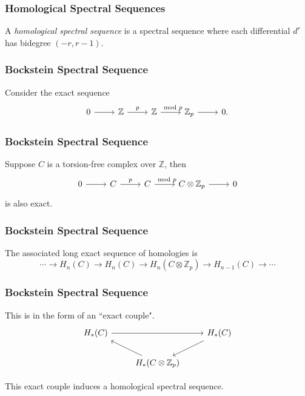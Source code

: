\documentclass{beamer}
\begin{document}

\begin{frame}
	\frametitle{Homological Spectral Sequences}

	\begin{definition}
		A \textit{homological spectral sequence} is a spectral sequence where each differential $d^{r}$ has bidegree $(-r,r-1)$.
	\end{definition}
\end{frame}

\begin{frame}[fragile]
	\frametitle{Bockstein Spectral Sequence}

	Consider the exact sequence
	\[
		\begin{tikzcd}
			0 \arrow[r] & \mathbb{Z} \arrow[r, "p"] & \mathbb{Z} \arrow[r, "\mod p"] & \mathbb{Z}_p \arrow[r] & 0.
		\end{tikzcd}
	\] 
\end{frame}

\begin{frame}[fragile]
	\frametitle{Bockstein Spectral Sequence}

	Suppose $C$ is a torsion-free complex over $\mathbb{Z}$, then
	\[
		\begin{tikzcd}
                        0 \arrow[r] & C \arrow[r, "p"] & C \arrow[r, "\mod p"] & C \otimes \mathbb{Z}_p \arrow[r] & 0
                \end{tikzcd}
	\] 
	is also exact.
\end{frame}

\begin{frame}
	\frametitle{Bockstein Spectral Sequence}

	The associated long exact sequence of homologies is
	\[
	\cdots \to H_{n}(C)\to H_{n}(C) \to H_{n}(C \otimes \mathbb{Z}_{p}) \to H_{n-1}(C) \to \cdots
	\] 
\end{frame}

\begin{frame}[fragile]
	\frametitle{Bockstein Spectral Sequence}

	This is in the form of an ``exact couple".
	\[
		\begin{tikzcd}
			H_{*}(C) \arrow[rr] &&H_{*}(C) \arrow[dl] \\
					    &H_{*}(C \otimes \mathbb{Z}_{p})\arrow[lu]
		\end{tikzcd}
	\] 

	\begin{theorem}
		This exact couple induces a homological spectral sequence.
	\end{theorem}
	\vspace{5mm}
\end{frame}
\end{document}
